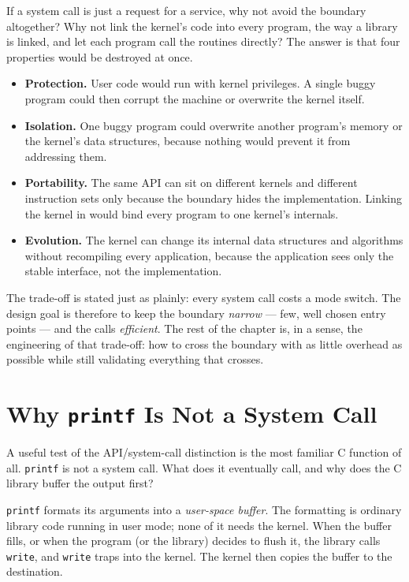 \documentclass[11pt]{article}
\begin{document}
If a system call is just a request for a service, why not avoid the boundary
altogether? Why not link the kernel's code into every program, the way a
library is linked, and let each program call the routines directly? The answer
is that four properties would be destroyed at once.

\begin{itemize}
  \item \textbf{Protection.} User code would run with kernel privileges. A
        single buggy program could then corrupt the machine or overwrite the
        kernel itself.
  \item \textbf{Isolation.} One buggy program could overwrite another
        program's memory or the kernel's data structures, because nothing would
        prevent it from addressing them.
  \item \textbf{Portability.} The same API can sit on different kernels and
        different instruction sets only because the boundary hides the
        implementation. Linking the kernel in would bind every program to one
        kernel's internals.
  \item \textbf{Evolution.} The kernel can change its internal data structures
        and algorithms without recompiling every application, because the
        application sees only the stable interface, not the implementation.
\end{itemize}

The trade-off is stated just as plainly: every system call costs a mode switch.
The design goal is therefore to keep the boundary \emph{narrow} --- few, well
chosen entry points --- and the calls \emph{efficient}. The rest of the chapter
is, in a sense, the engineering of that trade-off: how to cross the boundary
with as little overhead as possible while still validating everything that
crosses.

\section{Why \texttt{printf} Is Not a System Call}

A useful test of the API/system-call distinction is the most familiar C
function of all. \texttt{printf} is not a system call. What does it eventually
call, and why does the C library buffer the output first?

\texttt{printf} formats its arguments into a \emph{user-space buffer}. The
formatting is ordinary library code running in user mode; none of it needs the
kernel. When the buffer fills, or when the program (or the library) decides to
flush it, the library calls \texttt{write}, and \texttt{write} traps into the
kernel. The kernel then copies the buffer to the destination.
\end{document}
